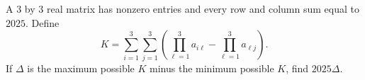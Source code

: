 A $3$ by $3$ real matrix has nonzero entries and every row and column sum equal to $2025$. Define
\[
K=\sum_{i=1}^3\sum_{j=1}^3
\left(\prod_{\ell=1}^3a_{i\ell}-\prod_{\ell=1}^3a_{\ell j}\right).
\]
If $\Delta$ is the maximum possible $K$ minus the minimum possible $K$, find $2025\Delta$.
